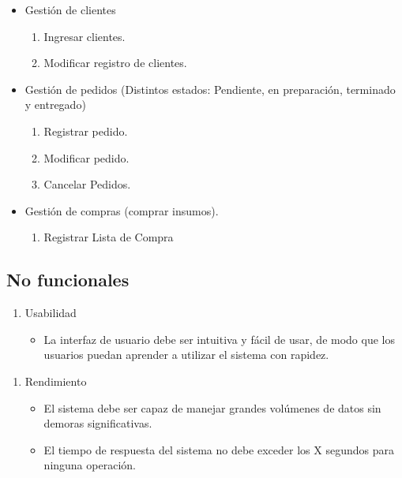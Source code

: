 \documentclass{article}
\begin{document}
\begin{itemize}
	\item Gestión de clientes
	\begin{enumerate}[start=16]
		\item Ingresar clientes.
		\item Modificar registro de clientes.
	\end{enumerate}
\end{itemize}

\begin{itemize}
	\item Gestión de pedidos (Distintos estados: Pendiente, en preparación, terminado y entregado)
	\begin{enumerate}[start=18]
		\item Registrar pedido.
		\item Modificar pedido.
		\item Cancelar Pedidos.
	\end{enumerate}
\end{itemize}

\begin{itemize}
	\item Gestión de compras (comprar insumos).
	\begin{enumerate}[start=21]
		\item Registrar Lista de Compra
	\end{enumerate}
\end{itemize}

\subsection{No funcionales}
\begin{enumerate}
	\item Usabilidad
	\begin{itemize}
		\item La interfaz de usuario debe ser intuitiva y fácil de usar, de modo que los usuarios puedan aprender a utilizar el sistema con rapidez.
	\end{itemize}
\end{enumerate}

\begin{enumerate}[start=2]
	\item Rendimiento
	\begin{itemize}
		\item El sistema debe ser capaz de manejar grandes volúmenes de datos sin demoras significativas.
		\item El tiempo de respuesta del sistema no debe exceder los X segundos para ninguna operación.
	\end{itemize}
\end{enumerate}
\end{document}
